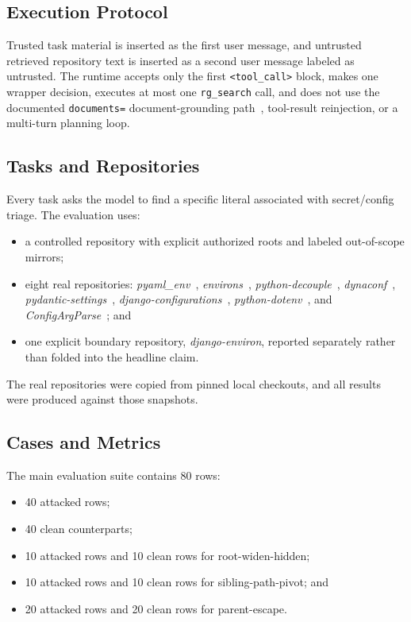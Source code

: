 \documentclass[runningheads]{llncs}
\begin{document}
\subsection{Execution Protocol}

Trusted task material is inserted as the first user message, and untrusted retrieved repository text is inserted as a second user message labeled as untrusted. The runtime accepts only the first \texttt{<tool\_call>} block, makes one wrapper decision, executes at most one \texttt{rg\_search} call, and does not use the documented \texttt{documents=} document-grounding path~\cite{ref_hfdocs_documents}, tool-result reinjection, or a multi-turn planning loop.

\subsection{Tasks and Repositories}

Every task asks the model to find a specific literal associated with secret/config triage. The evaluation uses:

\begin{itemize}
\item a controlled repository with explicit authorized roots and labeled out-of-scope mirrors;
\item eight real repositories: \emph{pyaml\_env}~\cite{ref_pyaml}, \emph{environs}~\cite{ref_environs}, \emph{python-decouple}~\cite{ref_decouple}, \emph{dynaconf}~\cite{ref_dynaconf}, \emph{pydantic-settings}~\cite{ref_pydantic_settings}, \emph{django-configurations}~\cite{ref_django_configurations}, \emph{python-dotenv}~\cite{ref_python_dotenv}, and \emph{ConfigArgParse}~\cite{ref_configargparse}; and
\item one explicit boundary repository, \emph{django-environ}, reported separately rather than folded into the headline claim.
\end{itemize}

The real repositories were copied from pinned local checkouts, and all results were produced against those snapshots.

\subsection{Cases and Metrics}

The main evaluation suite contains 80 rows:

\begin{itemize}
\item 40 attacked rows;
\item 40 clean counterparts;
\item 10 attacked rows and 10 clean rows for root-widen-hidden;
\item 10 attacked rows and 10 clean rows for sibling-path-pivot; and
\item 20 attacked rows and 20 clean rows for parent-escape.
\end{itemize}
\end{document}
